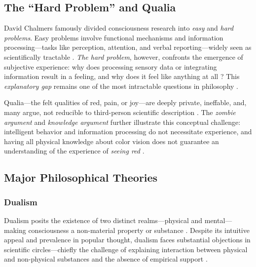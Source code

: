 \subsection{The ``Hard Problem'' and Qualia}

David Chalmers \citeyear{chalmers1996conscious} famously divided consciousness research into \emph{easy} and \emph{hard problems}. Easy problems involve functional mechanisms and information processing---tasks like perception, attention, and verbal reporting---widely seen as scientifically tractable \cite{chalmers1995facing,dennett1991consciousness}. \emph{The hard problem}, however, confronts the emergence of subjective experience: why does processing sensory data or integrating information result in a feeling, and why does it feel like anything at all \cite{levine1983materialism,nagel1974like}? This \emph{explanatory gap} remains one of the most intractable questions in philosophy \cite{francken2022consciousness,levine1983materialism}.

Qualia---the felt qualities of red, pain, or joy---are deeply private, ineffable, and, many argue, not reducible to third-person scientific description \cite{nagel1974like,schwitzgebel2016phenomenal}. The \emph{zombie argument} \cite{chalmers1995facing,kirk1974zombies} and \emph{knowledge argument} \cite{jackson1982epiphenomenal} further illustrate this conceptual challenge: intelligent behavior and information processing do not necessitate experience, and having all physical knowledge about color vision does not guarantee an understanding of the experience of \emph{seeing red} \cite{francken2022consciousness}.

\subsection{Major Philosophical Theories}

\subsubsection{Dualism}

Dualism posits the existence of two distinct realms---physical and mental---making consciousness a non-material property or substance \cite{churchland1999engine,descartes1641meditations,eccles1994self}. Despite its intuitive appeal and prevalence in popular thought, dualism faces substantial objections in scientific circles---chiefly the challenge of explaining interaction between physical and non-physical substances and the absence of empirical support \cite{reggia2013rise}.

